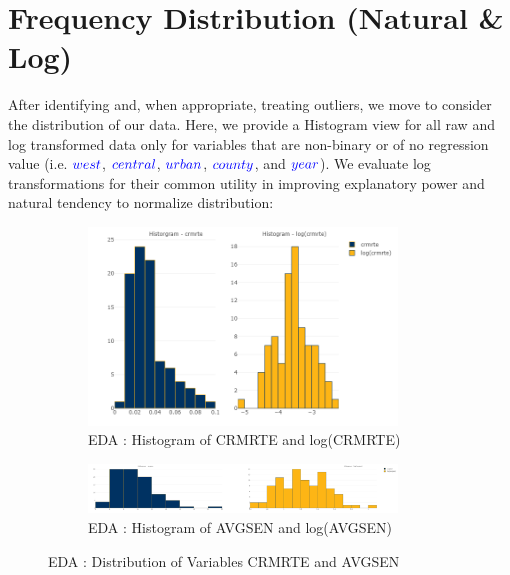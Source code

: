 \pagebreak

\section{Frequency Distribution (Natural \& Log)}

After identifying and, when appropriate, treating outliers, we move to consider the distribution of our data.  Here, we provide a Histogram view for all raw and log transformed data only for variables that are non-binary or of no regression value (i.e.  $\textcolor{Blue}{west}$, $\textcolor{Blue}{central}$, $\textcolor{Blue}{urban}$, $\textcolor{Blue}{county}$, and $\textcolor{Blue}{year}$).  We evaluate log transformations for their common utility in improving explanatory power and natural tendency to normalize distribution:\\

\begin{figure}[!ht]
	\begin{subfigure}[b]{1.0\textwidth}
		\centering
		\includegraphics[width=0.9\textwidth,height=0.30\textheight]{images/EDA_histograms_crmrte.jpg}
		\caption{EDA : Histogram of CRMRTE and log(CRMRTE)}
		\label{fig:EDA Histogram CRMRTE}
	\end{subfigure}\vspace{3mm}%
	
	\begin{subfigure}[b]{1.0\textwidth}
		\centering
		\includegraphics[width=0.9\textwidth,height=0.30\textheight]{images/EDA_histograms_avgsen.jpg}
		\caption{EDA : Histogram of AVGSEN and log(AVGSEN)}
		\label{fig:EDA Histogram AVGSEN}
	\end{subfigure}
	\label{fig:CRMRTE and AVGSEN Histogram}
	\caption{EDA : Distribution of Variables CRMRTE and AVGSEN}
\end{figure}

